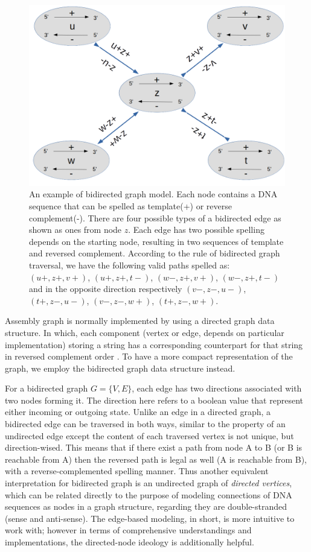 \begin{figure}[ht!]
\centering
\includegraphics[width=.7\textwidth]{images/bgraph.png}
\caption[An example of bidirected graph model]
{An example of bidirected graph model. Each node contains a DNA sequence that can be spelled as template(+) or reverse complement(-). There are four possible types of a bidirected edge as shown as ones from node $z$. Each edge has two possible spelling depends on the starting node, resulting in two sequences of template and reversed complement. According to the rule of bidirected graph traversal, we have the following valid paths spelled as: $(u+,z+,v+)$, $(u+,z+,t-)$, $(w-,z+,v+)$, $(w-,z+,t-)$ and in the opposite direction respectively $(v-,z-,u-)$, $(t+,z-,u-)$, $(v-,z-,w+)$, $(t+,z-,w+)$.}
\label{f:bgraph}
\end{figure}

Assembly graph is normally implemented by using a directed graph data structure. 
In which, each component (vertex or edge, depends on particular implementation) storing a string has a corresponding counterpart for that string in reversed complement order \cite{Zerbino2008}.
To have a more compact representation of the graph, we employ the bidirected graph data structure instead.

For a bidirected graph $G=\{V,E\}$, each edge has two directions associated with two nodes forming it. The direction here refers to a boolean value that represent either incoming or outgoing state.
Unlike an edge in a directed graph, a bidirected edge can be traversed in both ways, similar to the property of an undirected edge except the content of each traversed vertex is not unique, but direction-wised. This means that if there exist a path from node A to B (or B is reachable from A) then the reversed path is legal as well (A is reachable from B), with a reverse-complemented spelling manner. 
Thus another equivalent interpretation for bidirected graph is an undirected graph of \emph{directed vertices}, which can be related directly to the purpose of modeling connections of DNA sequences as nodes in a graph structure, regarding they are double-stranded (sense and anti-sense). 
The edge-based modeling, in short, is more intuitive to work with; however in terms of comprehensive understandings and implementations, the directed-node ideology is additionally helpful.

